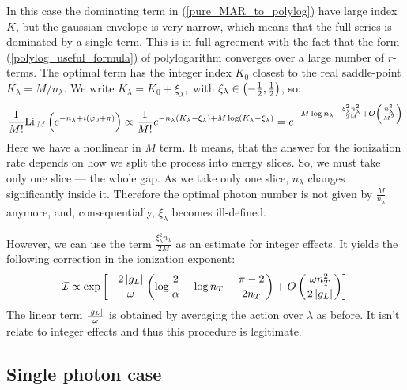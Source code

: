 In this
case the dominating term in (\ref{pure_MAR_to_polylog}) have large index $K$, but the gaussian
envelope is very narrow, which means that the
full series is dominated by a single term. This is in full agreement
with the fact that the form (\ref{polylog_useful_formula}) of polylogarithm  converges
over a large number of $r$-terms. The optimal
term has the integer index $K_{0}$ closest to the real saddle-point
$K_{\lambda}=M/ n_\lambda$. We write $
K_{\lambda}=K_{0}+\xi_\lambda,$ with $\xi_\lambda \in \left(-\frac{1}{2}, \frac{1}{2}\right)$, so:
\begin{gather}
\label{pure_mar_slice_shit}
\frac{1}{M!}
	\mathrm{Li}\,_M
	\left(
	e^{-n_\lambda+i\left(\varphi_0+\pi\right)}\right)
	\propto
	\frac{1}{M!}
	e^{-n_\lambda
		\left(K_\lambda-\xi_\lambda\right)
	+
	M
	\log  \left(K_\lambda-\xi_\lambda\right)
	}
	=
	e^{- M\log{n_\lambda}
		-
		\frac{\xi_\lambda^2 n_\lambda^2}{2M}
		+
		O\left(\frac{n_\lambda^3}{M^2}\right)
	}
\end{gather}
Here we have a nonlinear in $ M $ term. It means, that the answer for the ionization rate depends on how we split the process into energy slices. So, we must take only one slice --- the whole gap. As we take only one slice, $ n_\lambda $ changes significantly inside it. Therefore the optimal photon number is not given by $ \frac{M}{n_\lambda} $ anymore, and, consequentially,  $\xi_\lambda $ becomes ill-defined. 

However, we can use the term $ \frac{\xi_\lambda^2 n_\lambda}{2M} $ as an estimate for integer effects. It yields the following correction in the ionization exponent:
\begin{gather}
\label{final_ionization_pure_mar_2}
	\mathcal{I}
	\propto
	\exp
	\left[
		-\frac{2\left|g_L\right|}{\omega}
		\left(
			\log\frac{2}{\alpha}
			-
				\log n_T
			-
			\frac{\pi-2}{2n_T}
		\right)
	+
		O\left(	
			\frac{\omega n_T^2}{2\left|g_L\right|}\right)
	\right]
\end{gather}
The linear term $ \frac{\left|g_L\right|}{\omega} $ is obtained by averaging the action over $ \lambda $ as before. It isn't relate to integer effects and thus this procedure is legitimate.
\subsection{Single photon case}
\label{subsect:single_photon}


